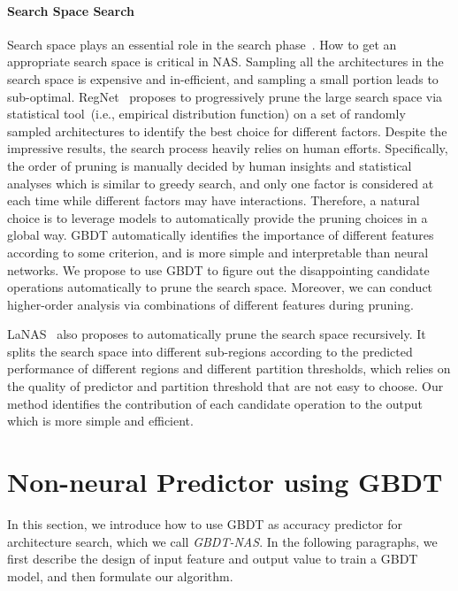 \documentclass{article}
\begin{document}
\paragraph{Search Space Search}
Search space plays an essential role in the search phase~\cite{rdarts,evanas}. How to get an appropriate search space is critical in NAS. Sampling all the architectures in the search space is expensive and in-efficient, and sampling a small portion leads to sub-optimal. RegNet~\cite{designspace} proposes to progressively prune the large search space via statistical tool~(i.e., empirical distribution function) on a set of randomly sampled architectures to identify the best choice for different factors. Despite the impressive results, the search process heavily relies on human efforts. Specifically, the order of pruning is manually decided by human insights and statistical analyses which is similar to greedy search, and only one factor is considered at each time while different factors may have interactions. Therefore, a natural choice is to leverage models to automatically provide the pruning choices in a global way. GBDT automatically identifies the importance of different features according to some criterion, and is more simple and interpretable than neural networks. We propose to use GBDT to figure out the disappointing candidate operations automatically to prune the search space. Moreover, we can conduct higher-order analysis via combinations of different features during pruning.

LaNAS~\cite{lanas} also proposes to automatically prune the search space recursively. It splits the search space into different sub-regions according to the predicted performance of different regions and different partition thresholds, which relies on the quality of predictor and partition threshold that are not easy to choose. Our method identifies the contribution of each candidate operation to the output which is more simple and efficient.

\section{Non-neural Predictor using GBDT}
\label{sec:gbdtnas}
In this section, we introduce how to use GBDT as accuracy predictor for architecture search, which we call \emph{GBDT-NAS}. In the following paragraphs, we first describe the design of input feature and output value to train a GBDT model, and then formulate our algorithm.  
\end{document}
